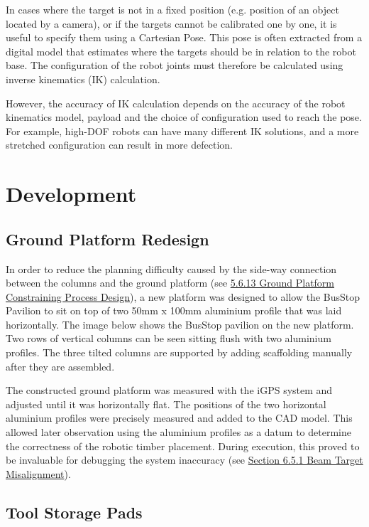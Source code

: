 In cases where the target is not in a fixed position (e.g. position of an object located by a camera), or if the targets cannot be calibrated one by one, it is useful to specify them using a Cartesian Pose. This pose is often extracted from a digital model that estimates where the targets should be in relation to the robot base. The configuration of the robot joints must therefore be calculated using inverse kinematics (IK) calculation. 

However, the accuracy of IK calculation depends on the accuracy of the robot kinematics model, payload and the choice of configuration used to reach the pose. For example, high-DOF robots can have many different IK solutions, and a more stretched configuration can result in more defection. 

\section{Development}
\label{section:exploration_3_development}

\subsection{Ground Platform Redesign}
\label{subsection:exploration_3_ground_platform_redesign}

In order to reduce the planning difficulty caused by the side-way connection between the columns and the ground platform (see \ul{5.6.13 Ground Platform Constraining Process Design}), a new platform was designed to allow the BusStop Pavilion to sit on top of two 50mm x 100mm aluminium profile that was laid horizontally. The image below shows the BusStop pavilion on the new platform. Two rows of vertical columns can be seen sitting flush with two aluminium profiles. The three tilted columns are supported by adding scaffolding manually after they are assembled.



The constructed ground platform was measured with the iGPS system and adjusted until it was horizontally flat. The positions of the two horizontal aluminium profiles were precisely measured and added to the CAD model. This allowed later observation using the aluminium profiles as a datum to determine the correctness of the robotic timber placement. During execution, this proved to be invaluable for debugging the system inaccuracy (see \ul{Section 6.5.1 Beam Target Misalignment}).

\subsection{Tool Storage Pads}
\label{subsection:exploration_3_tool_storage_pads}

